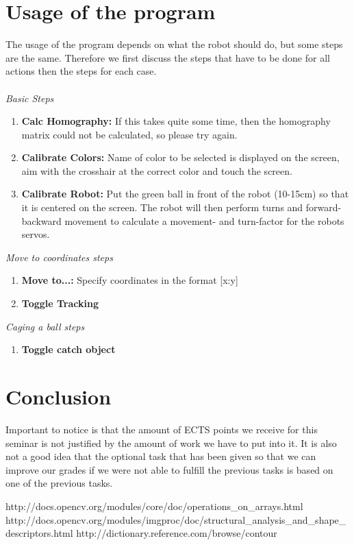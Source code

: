 \documentclass[703031]{iisreport}
\begin{document}
\section{Usage of the program}
\label{sec:usage}
The usage of the program depends on what the robot should do, but some steps are the same. Therefore we first discuss the steps that have to be done for all actions then the steps for each case.\\\\
\emph{Basic Steps}
	\begin{enumerate}
		\item \textbf{Calc Homography:} If this takes quite some time, then the homography matrix could not be calculated, so please try again.
		\item \textbf{Calibrate Colors:} Name of color to be selected is displayed on the screen, aim with the crosshair at the correct color and touch the screen.
		\item \textbf{Calibrate Robot:} Put the green ball in front of the robot (10-15cm) so that it is centered on the screen. The robot will then perform turns and forward-backward movement to calculate a movement- and turn-factor for the robots servos.\\
	\end{enumerate}
\emph{Move to coordinates steps}
	\begin{enumerate}
		\item \textbf{Move to...:} Specify coordinates in the format [x:y]
		\item \textbf{Toggle Tracking}\\
	\end{enumerate}
\emph{Caging a ball steps}
	\begin{enumerate}
		\item \textbf{Toggle catch object}
	\end{enumerate}
	
\section{Conclusion}
Important to notice is that the amount of ECTS points we receive for this seminar is not justified by the amount of work we have to put into it. It is also not a good idea that the optional task that has been given so that we can improve our grades if we were not able to fulfill the previous tasks is based on one of the previous tasks.


\small
\begin{thebibliography}{9}
		http://docs.opencv.org/modules/core/doc/operations\_on\_arrays.html	
		http://docs.opencv.org/modules/imgproc/doc/structural\_analysis\_and\_shape\_descriptors.html
		http://dictionary.reference.com/browse/contour
\end{thebibliography}
\end{document}

